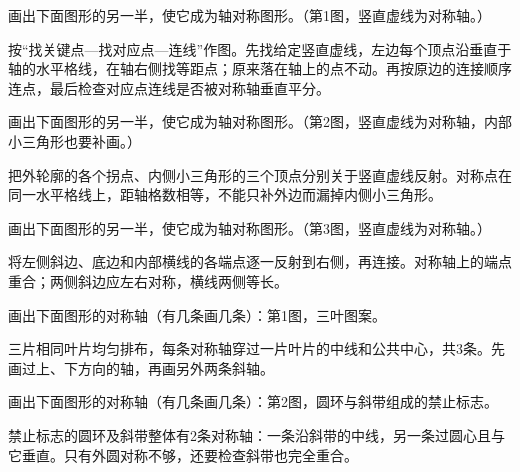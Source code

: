 画出下面图形的另一半，使它成为轴对称图形。（第1图，竖直虚线为对称轴。）\par
{}
\begin{BookAnswer}
按“找关键点—找对应点—连线”作图。先找给定竖直虚线，左边每个顶点沿垂直于轴的水平格线，在轴右侧找等距点；原来落在轴上的点不动。再按原边的连接顺序连点，最后检查对应点连线是否被对称轴垂直平分。
\end{BookAnswer}

画出下面图形的另一半，使它成为轴对称图形。（第2图，竖直虚线为对称轴，内部小三角形也要补画。）\par
{}
\begin{BookAnswer}
把外轮廓的各个拐点、内侧小三角形的三个顶点分别关于竖直虚线反射。对称点在同一水平格线上，距轴格数相等，不能只补外边而漏掉内侧小三角形。
\end{BookAnswer}

画出下面图形的另一半，使它成为轴对称图形。（第3图，竖直虚线为对称轴。）\par
{}
\begin{BookAnswer}
将左侧斜边、底边和内部横线的各端点逐一反射到右侧，再连接。对称轴上的端点重合；两侧斜边应左右对称，横线两侧等长。
\end{BookAnswer}

画出下面图形的对称轴（有几条画几条）：第1图，三叶图案。\par
{}
\begin{BookAnswer}
三片相同叶片均匀排布，每条对称轴穿过一片叶片的中线和公共中心，共3条。先画过上、下方向的轴，再画另外两条斜轴。
\end{BookAnswer}

画出下面图形的对称轴（有几条画几条）：第2图，圆环与斜带组成的禁止标志。\par
{}
\begin{BookAnswer}
禁止标志的圆环及斜带整体有2条对称轴：一条沿斜带的中线，另一条过圆心且与它垂直。只有外圆对称不够，还要检查斜带也完全重合。
\end{BookAnswer}

